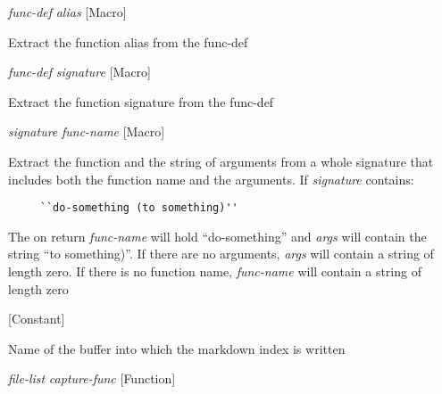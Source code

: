 \vspace{1em}
\noindent
{}
\usebox{\funcname}\emph{func-def} \emph{alias}
 \hfill [Macro]

\begin{doc-string}
Extract the function alias from the func-def
\end{doc-string}

\vspace{1em}
\noindent
{}
\usebox{\funcname}\emph{func-def} \emph{signature}
 \hfill [Macro]

\begin{doc-string}
Extract the function signature from the func-def
\end{doc-string}

\vspace{1em}
\noindent
{}
\usebox{\funcname}\emph{signature} \emph{func-name}
 \hfill [Macro]
\hspace*{\wd\funcname}

\begin{doc-string}
Extract the function and the string of arguments from a whole signature that
includes both the function name and the arguments.  If \emph{signature} contains:

\begin{verbatim}
     ``do-something (to something)''
\end{verbatim}

The on return \emph{func-name} will hold ``do-something'' and \emph{args} will contain the
string ``to something)''.  If there are no arguments, \emph{args} will contain a string
of length zero.  If there is no function name, \emph{func-name} will contain a string
of length zero
\end{doc-string}

\vspace{1em}
\noindent
{}
\usebox{\funcname}
 \hfill [Constant]

\begin{doc-string}
Name of the buffer into which the markdown index is written
\end{doc-string}

\vspace{1em}
\noindent
{}
\usebox{\funcname}\emph{file-list} \emph{capture-func}
 \hfill [Function]

